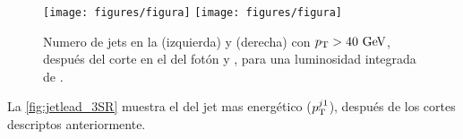 \begin{figure}[th!]
  \centering
  \texttt{[image: figures/figura]} %
  \texttt{[image: figures/figura]} %
  \caption{Numero de jets en la {\SRL} (izquierda) y {\SRH} (derecha) con $\pt > 40 \gev$,
    después del corte en el {\pt} del fotón y {\met}, para una luminosidad integrada de {\ilumi}.}
  \label{fig:Njet_3SR}
\end{figure}


La \cref{fig:jetlead_3SR} muestra el {\pt} del jet mas energético ($p_{\mathrm{T}}^{j1}$),
después de los cortes descriptos anteriormente. %

